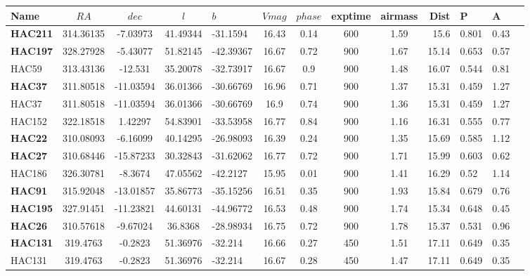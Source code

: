 \documentclass[a4paper,12pt]{article}
\begin{document}
\footnotesize  %
\setlength\LTleft{-60pt}            %
\setlength\LTright{-30pt}           %
\begin{longtable}{@{\extracolsep{\fill}}lccclccccrlll@{}}
 \hline
  Name & $RA$ & $dec$ & $l$ & $ b$ & $Vmag$ & $phase$ &  exptime & airmass & Dist & P & A & \\
 \hline
\textbf{HAC211} & 314.36135 & -7.03973 & 41.49344 & -31.1594 & 16.43 & 0.14 & 600 & 1.59 & 15.6 & 0.801 & 0.43 \\
\textbf{HAC197} & 328.27928 & -5.43077 & 51.82145 & -42.39367 & 16.67 & 0.72 & 900 & 1.67 & 15.14 & 0.653 & 0.57 \\
HAC59 & 313.43136 & -12.531 & 35.20078 & -32.73917 & 16.67 & 0.9 & 900 & 1.48 & 16.07 & 0.544 & 0.81 \\
\textbf{HAC37} & 311.80518 & -11.03594 & 36.01366 & -30.66769 & 16.96 & 0.71 & 900 & 1.37 & 15.31 & 0.459 & 1.27 \\
HAC37 & 311.80518 & -11.03594 & 36.01366 & -30.66769 & 16.9 & 0.74 & 900 & 1.36 & 15.31 & 0.459 & 1.27 \\
HAC152 & 322.18518 & 1.42297 & 54.83901 & -33.53958 & 16.77 & 0.84 & 900 & 1.16 & 16.31 & 0.555 & 0.77 \\
\textbf{HAC22} & 310.08093 & -6.16099 & 40.14295 & -26.98093 & 16.39 & 0.24 & 900 & 1.35 & 15.69 & 0.585 & 1.12 \\
\textbf{HAC27} & 310.68446 & -15.87233 & 30.32843 & -31.62062 & 16.77 & 0.72 & 900 & 1.71 & 15.99 & 0.603 & 0.62 \\
HAC186 & 326.30781 & -8.3674 & 47.05562 & -42.2127 & 15.95 & 0.01 & 900 & 1.41 & 16.29 & 0.52 & 1.14 \\
\textbf{HAC91} & 315.92048 & -13.01857 & 35.86773 & -35.15256 & 16.51 & 0.35 & 900 & 1.93 & 15.84 & 0.679 & 0.76 \\
\textbf{HAC195} & 327.91451 & -11.23821 & 44.60131 & -44.96772 & 16.53 & 0.48 & 900 & 1.74 & 15.34 & 0.648 & 0.45 \\
\textbf{HAC26} & 310.57618 & -9.67024 & 36.8368 & -28.98934 & 16.75 & 0.72 & 900 & 1.78 & 15.37 & 0.531 & 0.96 \\
\textbf{HAC131} & 319.4763 & -0.2823 & 51.36976 & -32.214 & 16.66 & 0.27 & 450 & 1.51 & 17.11 & 0.649 & 0.35 \\
HAC131 & 319.4763 & -0.2823 & 51.36976 & -32.214 & 16.67 & 0.28 & 450 & 1.47 & 17.11 & 0.649 & 0.35 \\

\end{longtable}
\end{document}
